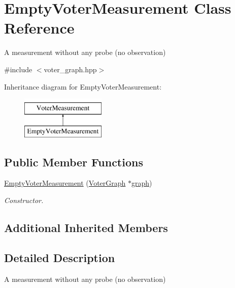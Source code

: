 \hypertarget{classEmptyVoterMeasurement}{\section{Empty\-Voter\-Measurement Class Reference}
\label{classEmptyVoterMeasurement}
}


A measurement without any probe (no observation)  




{\ttfamily \#include $<$voter\-\_\-graph.\-hpp$>$}

Inheritance diagram for Empty\-Voter\-Measurement\-:\begin{figure}[H]
\begin{center}
\leavevmode
\includegraphics[height=2.000000cm]{classEmptyVoterMeasurement}
\end{center}
\end{figure}
\subsection*{Public Member Functions}
\begin{DoxyCompactItemize}
\item 
\hyperlink{classEmptyVoterMeasurement_aff7c264f9f2e68e3608e30b359468ed0}{Empty\-Voter\-Measurement} (\hyperlink{classVoterGraph}{Voter\-Graph} $\ast$\hyperlink{classVoterMeasurement_a8d22d4b78f7e2f4c747f5716c4885351}{graph})
\begin{DoxyCompactList}\small\item\em Constructor. \end{DoxyCompactList}\end{DoxyCompactItemize}
\subsection*{Additional Inherited Members}


\subsection{Detailed Description}
A measurement without any probe (no observation) 

